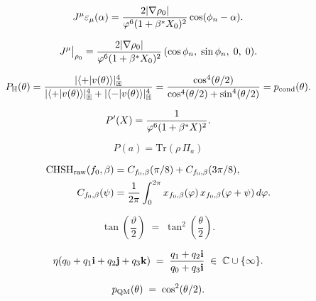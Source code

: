 \begin{equation}
  J^\mu\varepsilon_\mu(\alpha)
  = \frac{2|\nabla\rho_0|}{\varphi^6(1+\beta^{*} X_0)^2}
  \cos(\phi_n-\alpha).
  \label{P9:eq:J_eps}
\end{equation}

\begin{equation}
  J^\mu\big|_{\rho_0}
  = \frac{2|\nabla\rho_0|}{\varphi^6(1+\beta^{*} X_0)^2}\,
  (\cos\phi_n,\;\sin\phi_n,\;0,\;0).
  \label{P9:eq:J_saddle}
\end{equation}

\begin{equation}
  P_{\mathbb{H}}(\theta)
  = \frac{|\langle +|v(\theta)\rangle|_{\mathbb{H}}^4}
         {|\langle +|v(\theta)\rangle|_{\mathbb{H}}^4 + |\langle -|v(\theta)\rangle|_{\mathbb{H}}^4}
  = \frac{\cos^4(\theta/2)}{\cos^4(\theta/2)+\sin^4(\theta/2)}
  = p_{\mathrm{cond}}(\theta).
  \label{P9:eq:PH_is_Pcond}
\end{equation}

\begin{equation}
  P'(X)
  = \frac{1}{\varphi^6(1+\beta^{*} X)^2}.
  \label{P9:eq:Pprime}
\end{equation}

\begin{equation}
  P(a) = \mathrm{Tr}(\rho\, \Pi_a)
  \label{P9:eq:born_standard}
\end{equation}

\begin{align}
    \mathrm{CHSH}_\mathrm{raw}(f_0,\beta)
    &= C_{f_0,\beta}(\pi/8) + C_{f_0,\beta}(3\pi/8),
    \\
    C_{f_0,\beta}(\psi)
    &= \frac{1}{2\pi}\int_0^{2\pi}
       x_{f_0,\beta}(\varphi)\,x_{f_0,\beta}(\varphi+\psi)\,d\varphi.
    \nonumber
  \end{align}

\begin{equation}
  \tan\!\left(\frac{\vartheta}{2}\right)
  \;=\; \tan^2\!\left(\frac{\theta}{2}\right).
  \label{P9:eq:hopf_angle}
\end{equation}

\begin{equation}
  \eta(q_0+q_1\mathbf{i}+q_2\mathbf{j}+q_3\mathbf{k})
  \;=\; \frac{q_1+q_2\mathbf{i}}{q_0+q_3\mathbf{i}} \;\in\; \mathbb{C}\cup\{\infty\}.
  \label{P9:eq:hopf_map}
\end{equation}

\begin{equation}
  p_{\mathrm{QM}}(\theta) \;=\; \cos^2(\theta/2).
  \label{P9:eq:pQM_def}
\end{equation}

